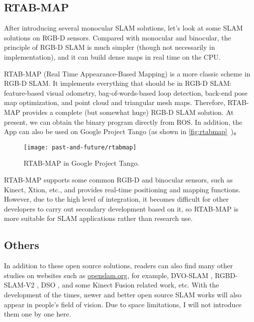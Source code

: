 \subsection{RTAB-MAP}
After introducing several monocular SLAM solutions, let's look at some SLAM solutions on RGB-D sensors. Compared with monocular and binocular, the principle of RGB-D SLAM is much simpler (though not necessarily in implementation), and it can build dense maps in real time on the CPU.

RTAB-MAP (Real Time Appearance-Based Mapping) {\cite{Labbe2014}} is a more classic scheme in RGB-D SLAM. It implements everything that should be in RGB-D SLAM: feature-based visual odometry, bag-of-words-based loop detection, back-end pose map optimization, and point cloud and triangular mesh maps. Therefore, RTAB-MAP provides a complete (but somewhat huge) RGB-D SLAM solution. At present, we can obtain the binary program directly from ROS. In addition, the App can also be used on Google Project Tango (as shown in \autoref{fig:rtabmap}~)。

\begin{figure}[!ht]
	\centering
	\texttt{[image: past-and-future/rtabmap]}
	\caption{RTAB-MAP in Google Project Tango.}
	\label{fig:rtabmap}
\end{figure}

RTAB-MAP supports some common RGB-D and binocular sensors, such as Kinect, Xtion, etc., and provides real-time positioning and mapping functions. However, due to the high level of integration, it becomes difficult for other developers to carry out secondary development based on it, so RTAB-MAP is more suitable for SLAM applications rather than research use.

\subsection{Others}
In addition to these open source solutions, readers can also find many other studies on websites such as \url{openslam.org}, for example, DVO-SLAM {\cite{Kerl2013a}}, RGBD-SLAM-V2 {\cite{Endres2014}}, DSO  {\cite{Engel2016}}, and some Kinect Fusion related work, etc. With the development of the times, newer and better open source SLAM works will also appear in people's field of vision. Due to space limitations, I will not introduce them one by one here.


